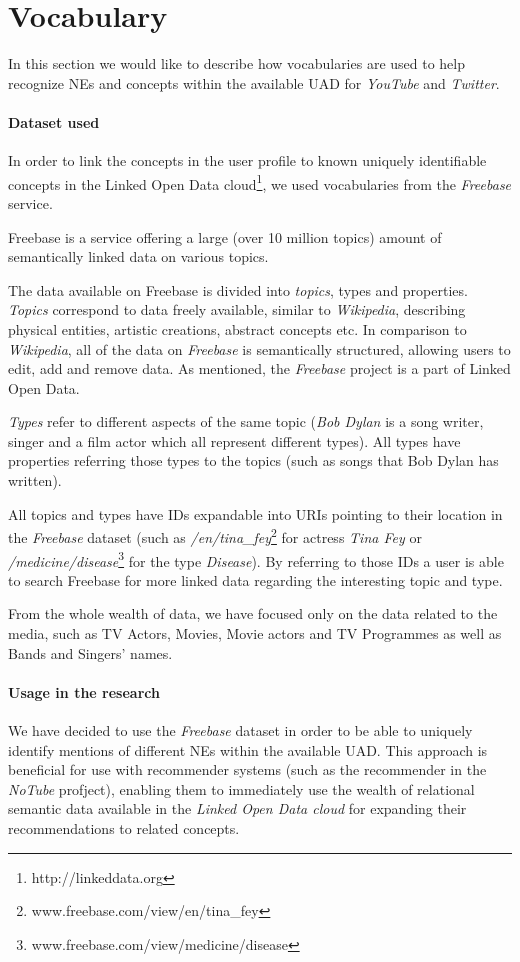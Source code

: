 \section{Vocabulary}
In this section we would like to describe how vocabularies are used to help recognize NEs and concepts within
the available UAD for \textit{YouTube} and \textit{Twitter}.

\paragraph{Dataset used}
In order to link the concepts in the user profile to known uniquely identifiable concepts in the Linked Open Data
cloud\footnote{http://linkeddata.org}, we used vocabularies from the \textit{Freebase} service.

Freebase is a service offering a large (over 10 million topics) amount of semantically linked data on various topics.

The data available on Freebase is divided into \textit{topics}, types and properties. \textit{Topics} correspond to data
freely available, similar to \textit{Wikipedia}, describing physical entities, artistic creations, abstract concepts
etc. In comparison to \textit{Wikipedia}, all of the data on \textit{Freebase} is semantically structured,
allowing users to edit, add and remove data. As mentioned, the \textit{Freebase} project is a part of Linked Open Data.

\textit{Types} refer to different aspects of the same topic (\eg \textit{Bob Dylan} is a song writer,
singer and a film actor which all represent different types). All types have properties referring those
types to the topics (such as songs that Bob Dylan has written).

All topics and types have IDs expandable into URIs pointing to their location in the \textit{Freebase} dataset
(such as \textit{/en/tina\_fey}\footnote{www.freebase.com/view/en/tina\_fey} for actress \textit{Tina Fey}
or \textit{/medicine/disease}\footnote{www.freebase.com/view/medicine/disease} for the type \textit{Disease}).
By referring to those IDs a user is able to search Freebase for more linked data regarding the interesting topic and type.

From the whole wealth of data, we have focused only on the data related to the media, such as TV Actors, Movies, Movie
actors and TV Programmes as well as Bands and Singers' names.

\paragraph{Usage in the research}
We have decided to use the \textit{Freebase} dataset in order to be able to uniquely identify mentions of different NEs
within the available UAD. This approach is beneficial for use with recommender systems (such as the recommender
in the \textit{NoTube} profject), enabling them to immediately use the wealth of relational semantic data available
in the \textit{Linked Open Data cloud} for expanding their recommendations to related concepts.
